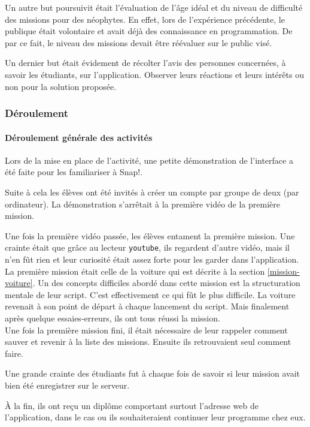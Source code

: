 Un autre but poursuivit était l'évaluation de l'âge idéal et du niveau de difficulté des missions pour des néophytes. En effet, lors de l'expérience précédente, le publique était volontaire et avait déjà des connaissance en programmation. De par ce fait, le niveau des missions devait être réévaluer sur le public visé.

Un dernier but était évidement de récolter l'avis des personnes concernées, à savoir les étudiants, sur l'application. Observer leurs réactions et leurs intérêts ou non pour la solution proposée.

\subsubsection{Déroulement}
\paragraph{Déroulement générale des activités}
Lors de la mise en place de l'activité, une petite démonstration de l'interface a été faite pour les familiariser à Snap!. 

Suite à cela les élèves ont été invités à créer un compte par groupe de deux (par ordinateur). La démonstration s'arrêtait à la première vidéo de la première mission.

Une fois la première vidéo passée, les élèves entament la première mission. Une crainte était que grâce au lecteur \texttt{youtube}, ils regardent d'autre vidéo, mais il n'en fût rien et leur curiosité était assez forte pour les garder dans l'application.\\

La première mission était celle de la voiture qui est décrite à la section \ref{mission-voiture}. Un des concepts difficiles abordé dans cette mission est la structuration mentale de leur script. C'est effectivement ce qui fût le plus difficile. La voiture revenait à son point de départ à chaque lancement du script. Mais finalement après quelque essaies-erreurs, ils ont tous réussi la mission.\\

Une fois la première mission fini, il était nécessaire de leur rappeler comment sauver et revenir à la liste des missions. Ensuite ils retrouvaient seul comment faire. 

Une grande crainte des étudiants fut à chaque fois de savoir si leur mission avait bien été enregistrer sur le serveur.

À la fin, ils ont reçu un diplôme comportant surtout l'adresse web de l'application, dans le cas ou ils souhaiteraient continuer leur programme chez eux.

